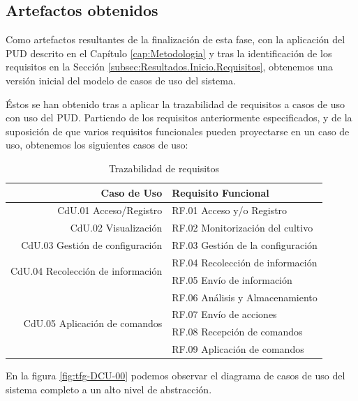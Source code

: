 \FloatBarrier
\subsection{Artefactos obtenidos}
\label{subsec:Resultados.Inicio.Artefactos}

Como artefactos resultantes de la finalización de esta fase, con la aplicación del PUD descrito en el Capítulo \ref{cap:Metodologia} y tras la identificación de los requisitos en la Sección \ref{subsec:Resultados.Inicio.Requisitos}, obtenemos una versión inicial del modelo de casos de uso del sistema.

Éstos se han obtenido tras a aplicar la trazabilidad de requisitos a casos de uso con uso del PUD. Partiendo de los requisitos anteriormente especificados, y de la suposición de que varios requisitos funcionales pueden proyectarse en un caso de uso, obtenemos los siguientes casos de uso:

\begin{table}[htb]
    \centering
    \caption{Trazabilidad de requisitos}
    \begin{tabular}[t]{ | r | l |}
        \hline
        \textbf{Caso de Uso} & \textbf{Requisito Funcional} \\ \hline \hline
        CdU.01 Acceso/Registro & RF.01 Acceso y/o Registro \\ \hline
        CdU.02 Visualización & RF.02 Monitorización del cultivo \\ \hline
        CdU.03 Gestión de configuración & RF.03 Gestión de la configuración \\ \hline
        \multirow{2}{*}{CdU.04 Recolección de información}
        & RF.04 Recolección de información \\
        & RF.05 Envío de información \\
        & RF.06 Análisis y Almacenamiento \\
        \hline
        \multirow{2}{*}{CdU.05 Aplicación de comandos}
        & RF.07 Envío de acciones \\
        & RF.08 Recepción de comandos \\
        & RF.09 Aplicación de comandos \\
        \hline
    \end{tabular}
    \label{tab:Trazabilidad.Requisitos}
\end{table}

En la figura \ref{fig:tfg-DCU-00} podemos observar el diagrama de casos de uso del sistema completo a un alto nivel de abstracción.

